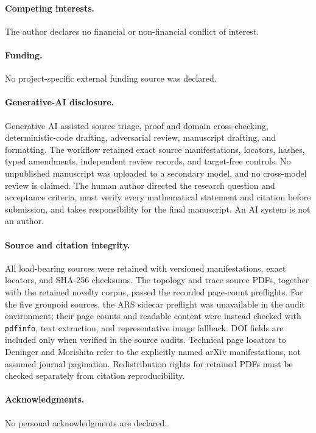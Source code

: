 \documentclass[11pt]{article}
\theoremstyle{definition}
\begin{document}
\paragraph{Competing interests.}
The author declares no financial or non-financial conflict of interest.

\paragraph{Funding.}
No project-specific external funding source was declared.

\paragraph{Generative-AI disclosure.}
Generative AI assisted source triage, proof and domain cross-checking, deterministic-code drafting, adversarial review, manuscript drafting, and formatting.  The workflow retained exact source manifestations, locators, hashes, typed amendments, independent review records, and target-free controls.  No unpublished manuscript was uploaded to a secondary model, and no cross-model review is claimed.  The human author directed the research question and acceptance criteria, must verify every mathematical statement and citation before submission, and takes responsibility for the final manuscript.  An AI system is not an author.

\paragraph{Source and citation integrity.}
All load-bearing sources were retained with versioned manifestations, exact locators, and SHA-256 checksums.  The topology and trace source PDFs, together with the retained novelty corpus, passed the recorded page-count preflights.  For the five groupoid sources, the ARS sidecar preflight was unavailable in the audit environment; their page counts and readable content were instead checked with \texttt{pdfinfo}, text extraction, and representative image fallback.  DOI fields are included only when verified in the source audits.  Technical page locators to Deninger and Morishita refer to the explicitly named arXiv manifestations, not assumed journal pagination.  Redistribution rights for retained PDFs must be checked separately from citation reproducibility.

\paragraph{Acknowledgments.}
No personal acknowledgments are declared.



\end{document}
